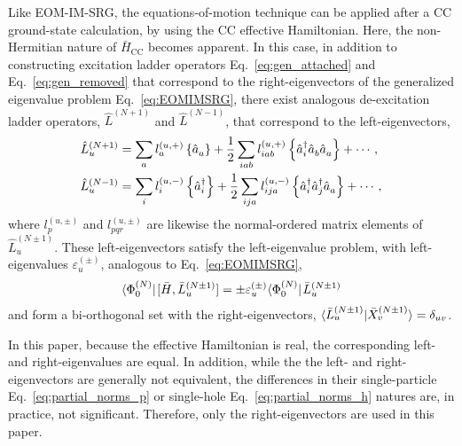 \documentclass[thesis.tex]{subfiles}
\begin{document}
Like EOM-IM-SRG, the equations-of-motion technique can be applied after a CC ground-state calculation, by using the CC effective Hamiltonian.  Here, the non-Hermitian nature of $\bar{H}_{\mathrm{CC}}$ becomes apparent.  In this case, in addition to constructing excitation ladder operators Eq.\ \eqref{eq:gen_attached} and Eq.\ \eqref{eq:gen_removed} that correspond to the right-eigenvectors of the generalized eigenvalue problem Eq.\ \eqref{eq:EOMIMSRG}, there exist analogous de-excitation ladder operators, $\hat{L}^{(N + 1)}$ and $\hat{L}^{(N - 1)}$, that correspond to the left-eigenvectors,
\begin{align*}
    \hat{L}^{(N + 1)}_u &= \sum_a l^{(u, +)}_a \left\{\hat{a}_a^{}\right\} + \frac{1}{2} \sum_{i a b} l^{(u, +)}_{i a b} \left\{\hat{a}^\dagger_i \hat{a}_b^{} \hat{a}_a^{}\right\} + \cdots, \\
    \hat{L}^{(N - 1)}_u &= \sum_i l_i^{(u, -)} \left\{\hat{a}^\dagger_i\right\} + \frac{1}{2} \sum_{i j a} l^{(u, -)}_{i j a} \left\{\hat{a}^\dagger_i \hat{a}^\dagger_j \hat{a}_a^{}\right\} + \cdots,
\end{align*}
where $l^{(u, \pm)}_p$ and $l^{(u, \pm)}_{p q r}$ are likewise the normal-ordered matrix elements of $\hat{L}^{(N \pm 1)}_u$.  These left-eigenvectors satisfy the left-eigenvalue problem, with left-eigenvalues $\varepsilon^{(\pm)}_u$, analogous to Eq.\ \eqref{eq:EOMIMSRG},
\begin{align*}
  \langle \Phi^{(N)}_0 |\hspace{1pt} [\bar{H}, \bar{L}^{(N \pm 1)}_u] = \pm \varepsilon^{(\pm)}_u \langle \Phi^{(N)}_0 |\hspace{1pt} \bar{L}^{(N \pm 1)}_u
\end{align*}
and form a bi-orthogonal set with the right-eigenvectors, $\langle \bar{L}^{(N \pm 1)}_u | \bar{X}^{(N \pm 1)}_v\rangle = \delta_{u v}$.

In this paper, because the effective Hamiltonian is real, the corresponding left- and right-eigenvalues are equal. In addition, while the the left- and right-eigenvectors are generally not equivalent, the differences in their single-particle Eq.\ \eqref{eq:partial_norms_p} or single-hole Eq.\ \eqref{eq:partial_norms_h} natures are, in practice, not significant.  Therefore, only the right-eigenvectors are used in this paper.


\end{document}
